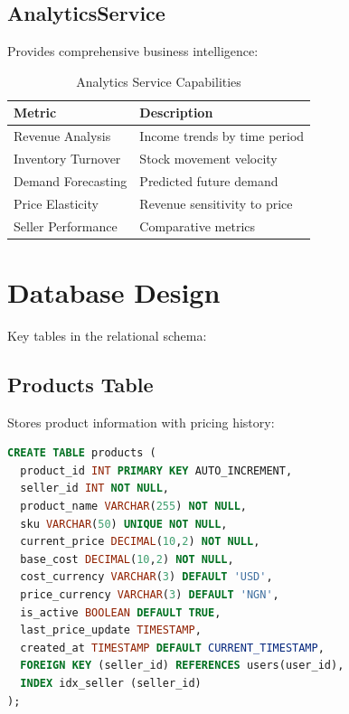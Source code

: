 \documentclass[12pt,a4paper,oneside]{report}
\begin{document}
\subsection{AnalyticsService}

Provides comprehensive business intelligence:

\begin{table}[H]
    \centering
    \begin{tabular}{ll}
        \toprule
        \textbf{Metric} & \textbf{Description} \\
        \midrule
        Revenue Analysis & Income trends by time period \\
        Inventory Turnover & Stock movement velocity \\
        Demand Forecasting & Predicted future demand \\
        Price Elasticity & Revenue sensitivity to price \\
        Seller Performance & Comparative metrics \\
        \bottomrule
    \end{tabular}
    \caption{Analytics Service Capabilities}
    \label{tab:analytics}
\end{table}

\section{Database Design}

Key tables in the relational schema:

\subsection{Products Table}

Stores product information with pricing history:

\begin{lstlisting}[language=SQL, caption=Products Table Schema]
CREATE TABLE products (
  product_id INT PRIMARY KEY AUTO_INCREMENT,
  seller_id INT NOT NULL,
  product_name VARCHAR(255) NOT NULL,
  sku VARCHAR(50) UNIQUE NOT NULL,
  current_price DECIMAL(10,2) NOT NULL,
  base_cost DECIMAL(10,2) NOT NULL,
  cost_currency VARCHAR(3) DEFAULT 'USD',
  price_currency VARCHAR(3) DEFAULT 'NGN',
  is_active BOOLEAN DEFAULT TRUE,
  last_price_update TIMESTAMP,
  created_at TIMESTAMP DEFAULT CURRENT_TIMESTAMP,
  FOREIGN KEY (seller_id) REFERENCES users(user_id),
  INDEX idx_seller (seller_id)
);
\end{lstlisting}
\end{document}
